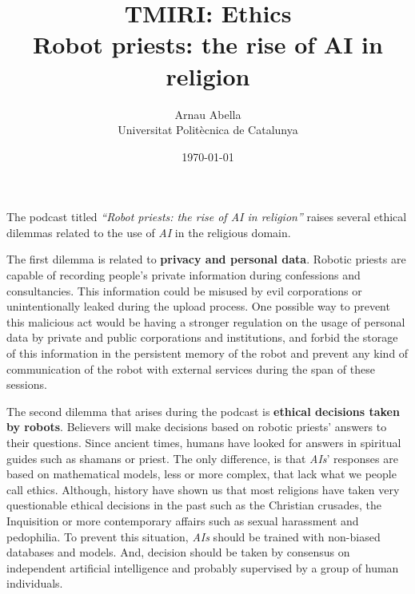 \documentclass[12pt, a4paper]{article}
\title{%
  \vspace{-10ex}
  TMIRI: Ethics\\
  \Large{Robot priests: the rise of AI in religion}
}
\author{
  Arnau Abella\\
  \small{Universitat Polit\`ecnica de Catalunya}
}
\date{\today}
\begin{document}
\maketitle

\vspace{5ex}

The podcast titled \textit{``Robot priests: the rise of AI in religion''} raises several ethical dilemmas related to the use of \textit{AI} in the religious domain.

The first dilemma is related to \textbf{privacy and personal data}. Robotic priests are capable of recording people's private information during confessions and consultancies. This information could be misused by evil corporations or unintentionally leaked during the upload process. One possible way to prevent this malicious act would be having a stronger regulation on the usage of personal data by private and public corporations and institutions, and forbid the storage of this information in the persistent memory of the robot and prevent any kind of communication of the robot with external services during the span of these sessions.

The second dilemma that arises during the podcast is \textbf{ethical decisions taken by robots}. Believers will make decisions based on robotic priests' answers to their questions.
Since ancient times, humans have looked for answers in spiritual guides such as shamans or priest. The only difference, is that \textit{AIs}' responses are based on mathematical models, less or more complex, that lack what we people call ethics. Although, history have shown us that most religions have taken very questionable ethical decisions in the past such as the Christian crusades, the Inquisition or more contemporary affairs such as sexual harassment and pedophilia. To prevent this situation, \textit{AIs} should be trained with non-biased databases and models. And, decision should be taken by consensus on independent artificial intelligence and probably supervised by a group of human individuals.

\newpage
\end{document}
